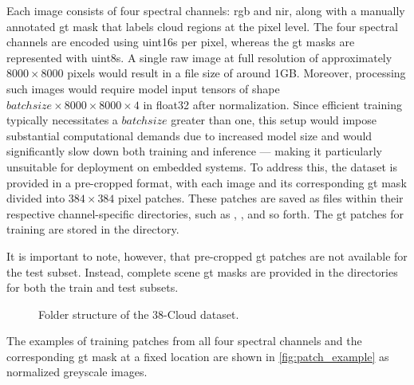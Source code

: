{Each image consists of four spectral channels: \gls{rgb} and \gls{nir}, along with a manually annotated \gls{gt} mask that labels cloud regions at the pixel level.
The four spectral channels are encoded using \glspl{uint16} per pixel, whereas the \gls{gt} masks are represented with \glspl{uint8}.
A single raw image at full resolution of approximately \ensuremath{8000\times8000} pixels would result in a file size of around 1GB.
Moreover, processing such images would require model input tensors of shape \ensuremath{batchsize\times8000\times8000\times4} in \gls{float32} after normalization.
Since efficient training typically necessitates a \ensuremath{batchsize} greater than one,
this setup would impose substantial computational demands due to increased model size and would significantly slow down both training and inference ---
making it particularly unsuitable for deployment on embedded systems.
To address this, the dataset is provided in a pre-cropped format, with each image and its corresponding \gls{gt} mask divided into \ensuremath{384\times384} pixel patches.
These patches are saved as  files within their respective channel-specific directories, such as , , and so forth.
The \gls{gt} patches for training are stored in the  directory.

It is important to note, however, that pre-cropped \gls{gt} patches are not available for the test subset.
Instead, complete scene \gls{gt} masks are provided in the  directories for both the train and test subsets.

\begin{figure}[!h]
\caption{Folder structure of the 38-Cloud dataset.}
\label{fig:dsFolderStruct}
\end{figure}

The examples of training patches from all four spectral channels and the corresponding \gls{gt} mask at a fixed location
are shown in \autoref{fig:patch_example} as normalized greyscale images. 

}
